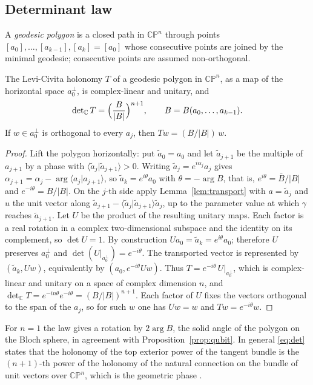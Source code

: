 \subsection{Determinant law}
A \emph{geodesic polygon} is a closed path in $\mathbb{CP}^n$ through points $[a_0],\dots,[a_{k-1}],[a_k]=[a_0]$ whose consecutive points are joined by the minimal geodesic; consecutive points are assumed non-orthogonal.

\begin{proposition}\label{prop:det}
The Levi-Civita holonomy $T$ of a geodesic polygon in $\mathbb{CP}^n$, as a map of the horizontal space $a_0^\perp$, is complex-linear and unitary, and
\begin{equation}\label{eq:det}
\det\nolimits_{\mathbb{C}}T=\Bigl(\frac{B}{|B|}\Bigr)^{n+1},\qquad B=B(a_0,\dots,a_{k-1}).
\end{equation}
If $w\in a_0^\perp$ is orthogonal to every $a_j$, then $Tw=(B/|B|)\,w$.
\end{proposition}
\begin{proof}
Lift the polygon horizontally: put $\tilde a_0=a_0$ and let $\tilde a_{j+1}$ be the multiple of $a_{j+1}$ by a phase with $\langle\tilde a_j|\tilde a_{j+1}\rangle>0$. Writing $\tilde a_j=e^{i\alpha_j}a_j$ gives $\alpha_{j+1}=\alpha_j-\arg\langle a_j|a_{j+1}\rangle$, so $\tilde a_k=e^{i\theta}a_0$ with $\theta=-\arg B$, that is, $e^{i\theta}=\overline{B}/|B|$ and $e^{-i\theta}=B/|B|$. On the $j$-th side apply Lemma~\ref{lem:transport} with $a=\tilde a_j$ and $u$ the unit vector along $\tilde a_{j+1}-\langle\tilde a_j|\tilde a_{j+1}\rangle\tilde a_j$, up to the parameter value at which $\gamma$ reaches $\tilde a_{j+1}$. Let $U$ be the product of the resulting unitary maps. Each factor is a real rotation in a complex two-dimensional subspace and the identity on its complement, so $\det U=1$. By construction $Ua_0=\tilde a_k=e^{i\theta}a_0$; therefore $U$ preserves $a_0^\perp$ and $\det(U|_{a_0^\perp})=e^{-i\theta}$. The transported vector is represented by $(\tilde a_k,Uw)$, equivalently by $(a_0,e^{-i\theta}Uw)$. Thus $T=e^{-i\theta}\,U|_{a_0^\perp}$, which is complex-linear and unitary on a space of complex dimension $n$, and $\det_{\mathbb{C}}T=e^{-in\theta}e^{-i\theta}=(B/|B|)^{n+1}$. Each factor of $U$ fixes the vectors orthogonal to the span of the $a_j$, so for such $w$ one has $Uw=w$ and $Tw=e^{-i\theta}w$.
\end{proof}

\begin{remark}
For $n=1$ the law gives a rotation by $2\arg B$, the solid angle of the polygon on the Bloch sphere, in agreement with Proposition~\ref{prop:qubit}. In general \eqref{eq:det} states that the holonomy of the top exterior power of the tangent bundle is the $(n+1)$-th power of the holonomy of the natural connection on the bundle of unit vectors over $\mathbb{CP}^n$, which is the geometric phase \cite{berry,simon,samuelbhandari}.
\end{remark}


